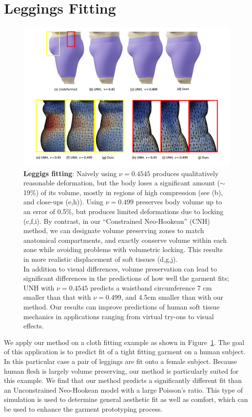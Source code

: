 \section{Leggings Fitting}

\begin{figure}
	\centering
	\includegraphics[width=1.0\textwidth]{images/teaser.png}
	\caption{\textbf{Leggigs fitting}: 
		Naively using $\nu = 0.4545$ produces qualitatively
		reasonable deformation, but the body loses a significant amount
		($\sim$19\%) of its volume, mostly in regions of high compression
		(see (b), and close-ups (e,h)). Using $\nu = 0.499$ preserves body
		volume up to an error of 0.5\%, but produces limited deformations
		due to locking (c,f,i).  By contrast, in our ``Constrained
		Neo-Hookean'' (CNH) method, we can designate volume preserving
		zones to match anatomical compartments, and exactly conserve
		volume within each zone while avoiding problems with volumetric
		locking. This results in more realistic displacement of soft
		tissues (d,g,j).
		\\
		In addition to visual differences, volume preservation can lead to
		significant differences in the predictions of how well the garment
		fits; UNH with $\nu = 0.4545$ predicts a waistband circumference 7
		cm smaller than that with $\nu = 0.499$, and 4.5cm smaller than
		with our method.  Our results can improve predictions of human
		soft tissue mechanics in applications ranging from virtual try-ons
		to visual effects.  }
	\label{fig:teaser}
\end{figure}

We apply our method on a cloth fitting example as shown in Figure~\ref{fig:teaser}. The goal of this
application is to predict fit of a tight fitting garment on a human subject. In this particular case
a pair of leggings are fit onto a female subject. Because human flesh is largely volume preserving, our
method is particularly suited for this example. We find that our method predicts a significantly
different fit than an Unconstrained Neo-Hookean model with a large Poisson's ratio.  This type of
simulation is used to determine general aesthetic fit as well as comfort, which can be used to
enhance the garment prototyping process.



